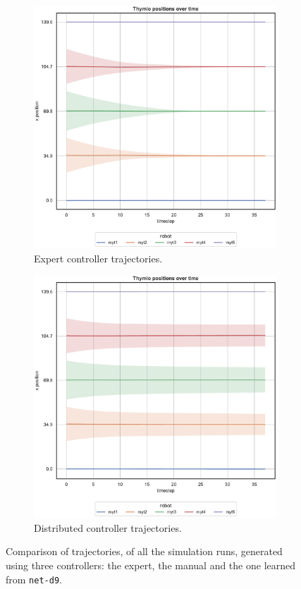 \begin{figure}[!htb]
	\begin{center}
		\begin{subfigure}[h]{0.49\textwidth}
			\centering
			\includegraphics[width=.9\textwidth]{contents/images/net-d9/position-overtime-omniscient}%
			\caption{Expert controller trajectories.}
		\end{subfigure}
		\hfill
		\begin{subfigure}[h]{0.49\textwidth}
			\centering
			\includegraphics[width=.9\textwidth]{contents/images/net-d9/position-overtime-learned_distributed}
			\caption{Distributed controller trajectories.}
		\end{subfigure}
	\end{center}
\vspace{-0.5cm}
	\caption[Evaluation of the trajectories learned by 
\texttt{net-d9}.]{Comparison of trajectories, of all the simulation runs, 
	generated using three controllers: the expert, the manual and the one learned 
	from \texttt{net-d9}.}
\end{figure}
